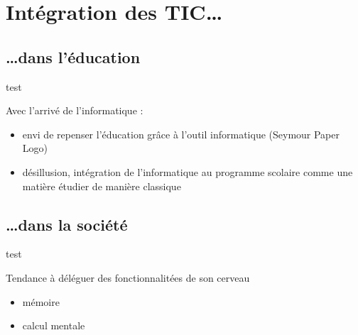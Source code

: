 \section{Intégration des TIC\ldots}

\subsection{\ldots dans l'éducation}

\begin{frame}{test}

Avec l'arrivé de l'informatique :
\begin{itemize}
\item envi de repenser l'éducation grâce à l'outil informatique (Seymour Paper Logo)
\item désillusion, intégration de l'informatique au programme scolaire comme une matière étudier de manière classique
\end{itemize}

\end{frame}



\subsection{\ldots dans la société}

\begin{frame}{test}

Tendance à déléguer des fonctionnalitées de son cerveau 
\begin{itemize}
\item mémoire
\item calcul mentale
\end{itemize}

\end{frame}
